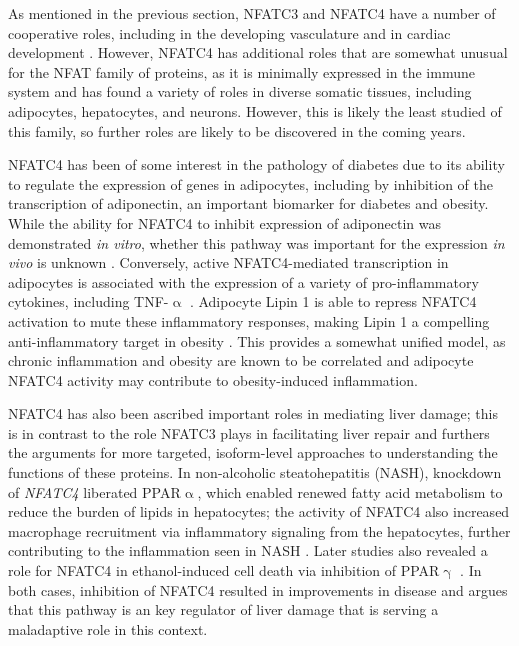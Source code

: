 As mentioned in the previous section, NFATC3 and NFATC4 have a number of cooperative roles, including in the developing vasculature and in cardiac development \citep{Graef2001, Bushdid2003}. However, NFATC4 has additional roles that are somewhat unusual for the NFAT family of proteins, as it is minimally expressed in the immune system and has found a variety of roles in diverse somatic tissues, including adipocytes, hepatocytes, and neurons. However, this is likely the least studied of this family, so further roles are likely to be discovered in the coming years.

NFATC4 has been of some interest in the pathology of diabetes due to its ability to regulate the expression of genes in adipocytes, including by inhibition of the transcription of adiponectin, an important biomarker for diabetes and obesity. While the ability for NFATC4 to inhibit expression of adiponectin was demonstrated \textit{in vitro}, whether this pathway was important for the expression \textit{in vivo} is unknown \citep{Kim2006}. Conversely, active NFATC4\hyp{}mediated transcription in adipocytes is associated with the expression of a variety of pro\hyp{}inflammatory cytokines, including TNF\hyp{}$\upalpha$ \citep{Kim2008}. Adipocyte Lipin 1 is able to repress NFATC4 activation to mute these inflammatory responses, making Lipin 1 a compelling anti\hyp{}inflammatory target in obesity \citep{Kim2010}. This provides a somewhat unified model, as chronic inflammation and obesity are known to be correlated and adipocyte NFATC4 activity may contribute to obesity\hyp{}induced inflammation. 

NFATC4 has also been ascribed important roles in mediating liver damage; this is in contrast to the role NFATC3 plays in facilitating liver repair and furthers the arguments for more targeted, isoform\hyp{}level approaches to understanding the functions of these proteins. In non\hyp{}alcoholic steatohepatitis (NASH), knockdown of \textit{NFATC4} liberated PPAR$\upalpha$, which enabled renewed fatty acid metabolism to reduce the burden of lipids in hepatocytes; the activity of NFATC4 also increased macrophage recruitment via inflammatory signaling from the hepatocytes, further contributing to the inflammation seen in NASH \citep{Du2020}. Later studies also revealed a role for NFATC4 in ethanol\hyp{}induced cell death via inhibition of PPAR$\upgamma$ \citep{Wu2021}. In both cases, inhibition of NFATC4 resulted in improvements in disease and argues that this pathway is an key regulator of liver damage that is serving a maladaptive role in this context.

